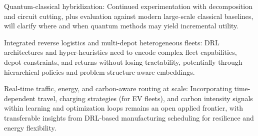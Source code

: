 Quantum-classical hybridization: Continued experimentation with decomposition and circuit cutting, plus evaluation against modern large-scale classical baselines, will clarify where and when quantum methods may yield incremental utility.​

Integrated reverse logistics and multi-depot heterogeneous fleets: DRL architectures and hyper-heuristics need to encode complex fleet capabilities, depot constraints, and returns without losing tractability, potentially through hierarchical policies and problem-structure-aware embeddings.​

Real-time traffic, energy, and carbon-aware routing at scale: Incorporating time-dependent travel, charging strategies (for EV fleets), and carbon intensity signals within learning and optimization loops remains an open applied frontier, with transferable insights from DRL-based manufacturing scheduling for resilience and energy flexibility.​





